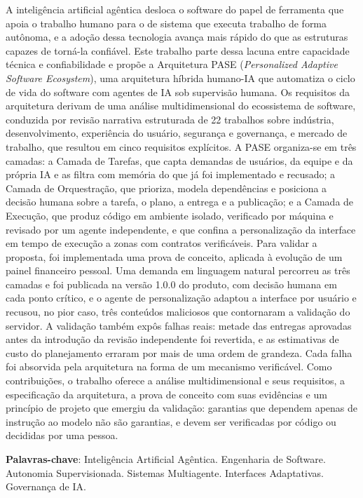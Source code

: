 
\setlength{\absparsep}{18pt} %
\begin{resumo}
A inteligência artificial agêntica desloca o software do papel de ferramenta que apoia o trabalho humano para o de sistema que executa trabalho de forma autônoma, e a adoção dessa tecnologia avança mais rápido do que as estruturas capazes de torná-la confiável. Este trabalho parte dessa lacuna entre capacidade técnica e confiabilidade e propõe a Arquitetura PASE (\textit{Personalized Adaptive Software Ecosystem}), uma arquitetura híbrida humano-IA que automatiza o ciclo de vida do software com agentes de IA sob supervisão humana. Os requisitos da arquitetura derivam de uma análise multidimensional do ecossistema de software, conduzida por revisão narrativa estruturada de 22 trabalhos sobre indústria, desenvolvimento, experiência do usuário, segurança e governança, e mercado de trabalho, que resultou em cinco requisitos explícitos. A PASE organiza-se em três camadas: a Camada de Tarefas, que capta demandas de usuários, da equipe e da própria IA e as filtra com memória do que já foi implementado e recusado; a Camada de Orquestração, que prioriza, modela dependências e posiciona a decisão humana sobre a tarefa, o plano, a entrega e a publicação; e a Camada de Execução, que produz código em ambiente isolado, verificado por máquina e revisado por um agente independente, e que confina a personalização da interface em tempo de execução a zonas com contratos verificáveis. Para validar a proposta, foi implementada uma prova de conceito, aplicada à evolução de um painel financeiro pessoal. Uma demanda em linguagem natural percorreu as três camadas e foi publicada na versão 1.0.0 do produto, com decisão humana em cada ponto crítico, e o agente de personalização adaptou a interface por usuário e recusou, no pior caso, três conteúdos maliciosos que contornaram a validação do servidor. A validação também expôs falhas reais: metade das entregas aprovadas antes da introdução da revisão independente foi revertida, e as estimativas de custo do planejamento erraram por mais de uma ordem de grandeza. Cada falha foi absorvida pela arquitetura na forma de um mecanismo verificável. Como contribuições, o trabalho oferece a análise multidimensional e seus requisitos, a especificação da arquitetura, a prova de conceito com suas evidências e um princípio de projeto que emergiu da validação: garantias que dependem apenas de instrução ao modelo não são garantias, e devem ser verificadas por código ou decididas por uma pessoa.

\textbf{Palavras-chave}: Inteligência Artificial Agêntica. Engenharia de Software. Autonomia Supervisionada. Sistemas Multiagente. Interfaces Adaptativas. Governança de IA.
\end{resumo}

